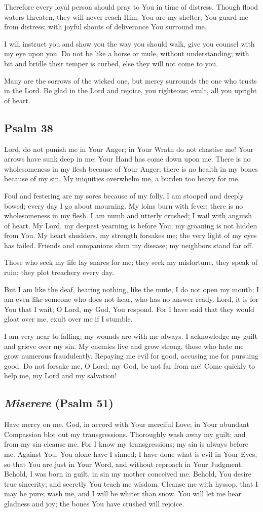 \documentclass[12pt]{article}
\newcommand{\prayertitle}[1]{\subsection{#1}}
\newcommand{\indulgencedprayertitle}[1]{\prayertitle{#1 \protect\kreuz}}
\newcommand{\emphasis}[1]{\emph{#1}}
\newcommand{\emphasis}[1]{\textsl{#1}}
\newcommand{\foreign}[1]{\emphasis{#1}}
\begin{document}
Therefore every loyal person should pray to You in time of distress.
Though flood waters threaten, they will never reach Him.
You are my shelter; You guard me from distress;
with joyful shouts of deliverance You surround me.

I will instruct you and show you the way you should walk, give you counsel with my eye upon you.
Do not be like a horse or mule, without understanding;
with bit and bridle their temper is curbed, else they will not come to you.

Many are the sorrows of the wicked one, but mercy surrounds the one who trusts in the Lord.
Be glad in the Lord and rejoice, you righteous;
exult, all you upright of heart.

\indulgencedprayertitle{Psalm 38}
Lord, do not punish me in Your Anger;
in Your Wrath do not chastise me!
Your arrows have sunk deep in me;
Your Hand has come down upon me.
There is no wholesomeness in my flesh because of Your Anger;
there is no health in my bones because of my sin.
My iniquities overwhelm me, a burden too heavy for me.

Foul and festering are my sores because of my folly.
I am stooped and deeply bowed;
every day I go about mourning.
My loins burn with fever;
there is no wholesomeness in my flesh.
I am numb and utterly crushed;
I wail with anguish of heart.
My Lord, my deepest yearning is before You;
my groaning is not hidden from You.
My heart shudders, my strength forsakes me;
the very light of my eyes has failed.
Friends and companions shun my disease;
my neighbors stand far off.

Those who seek my life lay snares for me;
they seek my misfortune, they speak of ruin;
they plot treachery every day.

But I am like the deaf, hearing nothing, like the mute, I do not open my mouth;
I am even like someone who does not hear, who has no answer ready.
Lord, it is for You that I wait;
O Lord, my God, You respond.
For I have said that they would gloat over me, exult over me if I stumble.

I am very near to falling;
my wounds are with me always.
I acknowledge my guilt
and grieve over my sin.
My enemies live and grow strong, those who hate me grow numerous fraudulently.
Repaying me evil for good,
accusing me for pursuing good.
Do not forsake me, O Lord;
my God, be not far from me!
Come quickly to help me, my Lord and my salvation!

\indulgencedprayertitle{\foreign{Miserere} (Psalm 51)}
Have mercy on me, God, in accord with Your merciful Love;
in Your abundant Compassion blot out my transgressions.
Thoroughly wash away my guilt;
and from my sin cleanse me.
For I know my transgressions;
my sin is always before me.
Against You, You alone have I sinned;
I have done what is evil in Your Eyes;
so that You are just in Your Word, and without reproach in Your Judgment.
Behold, I was born in guilt, in sin my mother conceived me.
Behold, You desire true sincerity;
and secretly You teach me wisdom.
Cleanse me with hyssop, that I may be pure;
wash me, and I will be whiter than snow.
You will let me hear gladness and joy;
the bones You have crushed will rejoice.
\end{document}
